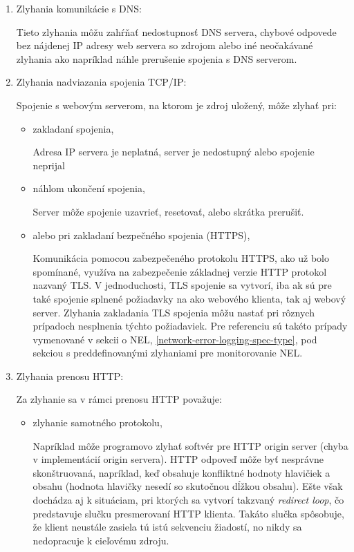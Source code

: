 \begin{enumerate}
    \item Zlyhania komunikácie s DNS:

    Tieto zlyhania môžu zahŕňať nedostupnosť DNS servera, chybové odpovede bez nájdenej 
    IP adresy web servera so zdrojom alebo iné neočakávané zlyhania ako napríklad náhle prerušenie spojenia s DNS serverom.
    
    \item Zlyhania nadviazania spojenia TCP/IP:

    Spojenie s webovým serverom, na ktorom je zdroj uložený, môže zlyhať pri:
    \begin{itemize}
        \item zakladaní spojenia,
        
        Adresa IP servera je neplatná, server je nedostupný alebo spojenie neprijal
        
        \item náhlom ukončení spojenia,

        Server môže spojenie uzavrieť, resetovať, alebo skrátka prerušiť.  

        \item alebo pri zakladaní bezpečného spojenia (HTTPS),

        Komunikácia pomocou zabezpečeného protokolu HTTPS, ako už bolo spomínané, využíva na zabezpečenie základnej verzie HTTP protokol nazvaný TLS.
        V jednoduchosti, TLS spojenie sa vytvorí, iba ak sú pre také spojenie splnené požiadavky na ako webového klienta, tak aj webový server. 
        Zlyhania zakladania TLS spojenia môžu nastať pri rôznych prípadoch nesplnenia týchto požiadaviek. 
        Pre referenciu sú takéto prípady vymenované v sekcii o NEL, \ref{network-error-logging-spec-type}, 
        pod sekciou s preddefinovanými zlyhaniami pre monitorovanie NEL.
        
    \end{itemize}
    
    \item Zlyhania prenosu HTTP:

    Za zlyhanie sa v rámci prenosu HTTP považuje:
    \begin{itemize}
        \item zlyhanie samotného protokolu,

        Napríklad môže programovo zlyhať softvér pre HTTP origin server (chyba v implementácií origin servera).
        HTTP odpoveď môže byť nesprávne skonštruovaná, napríklad, keď obsahuje konfliktné hodnoty hlavičiek a obsahu (hodnota hlavičky  nesedí so skutočnou dĺžkou obsahu).  
        Ešte však dochádza aj k situáciam, pri ktorých sa vytvorí takzvaný \textit{redirect loop}, čo predstavuje slučku presmerovaní HTTP klienta. Takáto slučka spôsobuje, že klient neustále zasiela tú istú sekvenciu žiadostí, no nikdy sa nedopracuje k cieľovému zdroju.
        

\end{itemize}
\end{enumerate}
